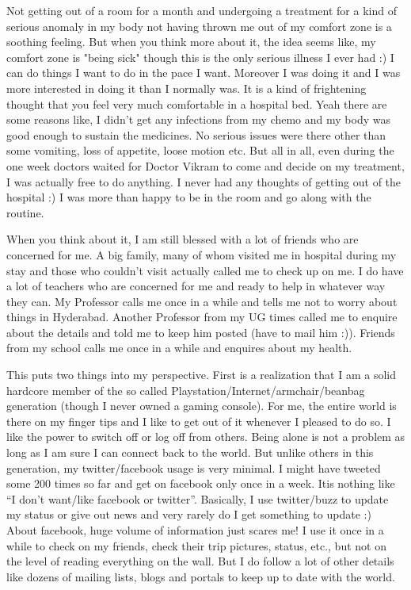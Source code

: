 Not getting out of a room for a month and undergoing a treatment for a kind of serious anomaly in my body not having thrown me out of my comfort zone is a soothing feeling. But when you think more about it, the idea seems like, my comfort zone is "being sick" though this is the only serious illness I ever had :) I can do things I want to do in the pace I want. Moreover I was doing it and I was more interested in doing it than I normally was. It is a kind of frightening thought that you feel very much comfortable in a hospital bed. Yeah there are some reasons like, I didn't get any infections from my chemo and my body was good enough to sustain the medicines. No serious issues were there other than some vomiting, loss of appetite, loose motion etc. But all in all, even during the one week doctors waited for Doctor Vikram to come and decide on my treatment, I was actually free to do anything. I never had any thoughts of getting out of the hospital :) I was more than happy to be in the room and go along with the routine. 

When you think about it, I am still blessed with a lot of friends who are concerned for me. A big family, many of whom visited me in hospital during my stay and those who couldn't visit actually called me to check up on me. I do have a lot of teachers who are concerned for me and ready to help in whatever way they can. My Professor calls me once in a while and tells me not to worry about things in Hyderabad. Another Professor from my UG times called me to enquire about the details and told me to keep him posted (have to mail him :)). Friends from my school calls me once in a while and enquires about my health.

This puts two things into my perspective. First is a realization that I am a solid hardcore member of the so called Playstation/Internet/armchair/beanbag generation (though I never owned a gaming console). For me, the entire world is there on my finger tips and I like to get out of it whenever I pleased to do so. I like the power to switch off or log off from others. Being alone is not a problem as long as I am sure I can connect back to the world. But unlike others in this generation, my twitter/facebook usage is very minimal. I might have tweeted some 200 times so far and get on facebook only once in a week. Itis nothing like ``I don't want/like facebook or twitter''. Basically, I use twitter/buzz to update my status or give out news and very rarely do I get something to update :) About facebook, huge volume of information just scares me! I use it once in a while to check on my friends, check their trip pictures, status, etc., but not on the level of reading everything on the wall. But I do follow a lot of other details like dozens of mailing lists, blogs and portals to keep up to date with the world. 

